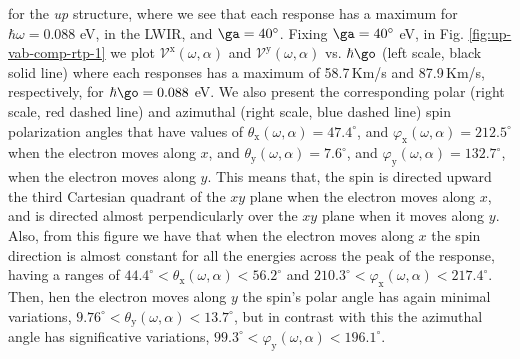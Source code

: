 \documentclass[prb,11pt,tightenlines,twocolumn,aps]{revtex4-1}
\begin{document}
for the
\emph{up} structure, where
%
we see that each response has a maximum for
$\hbar\omega=0.088$ eV,
in the LWIR, and 
$\ga=40^{\circ}$. 
% 
Fixing $\ga=40^{\circ}$ eV,
in Fig. \ref{fig:up-vab-comp-rtp-1} we plot 
$\mathcal{V}^{\mathrm{x}} (\omega,\alpha)$ 
and $\mathcal{V}^{\mathrm{y}}(\omega,\alpha)$ vs. $\hbar\go$
(left scale, black solid line) 
where each responses has a maximum of
58.7\,Km/s and 87.9\,Km/s, respectively, for $\hbar\go=0.088$ eV.
% 
We also
present the corresponding polar 
(right scale, red dashed line) 
and azimuthal 
(right scale, blue dashed line)
spin polarization angles
that have values of 
$\theta_{\mathrm{x}}(\omega,\alpha) = 47.4^{\circ}$,
and $\varphi_{\mathrm{x}}(\omega,\alpha) = 212.5^{\circ}$
 when the  electron moves along $x$,
and  $\theta_{\mathrm{y}}(\omega,\alpha) = 7.6^{\circ}$, and
 $\varphi_{\mathrm{y}} (\omega,\alpha) =132.7^{\circ}$,
when the electron moves along $y$.
This means that, the spin is directed upward the third Cartesian
quadrant of the $xy$ plane when the electron moves along $x$, and is directed almost
perpendicularly over the $xy$ plane when it moves along $y$.
% 
Also, from this figure we have that when the electron moves along $x$ the spin
direction is almost constant for all the energies across the peak of the
response, having a ranges of $ 44.4^{\circ} < \theta_{\mathrm{x}}
(\omega,\alpha) < 56.2^{\circ} $ and $210.3^{\circ} < \varphi_{\mathrm{x}}
(\omega,\alpha) < 217.4^{\circ}$. Then, hen the electron moves along $y$ the
spin's polar angle has again minimal variations, $ 9.76^{\circ} <
\theta_{\mathrm{y}} (\omega,\alpha) < 13.7^{\circ}$, but in contrast with this
the azimuthal angle has significative variations, $99.3^{\circ} <
\varphi_{\mathrm{y}} (\omega,\alpha) < 196.1^{\circ}$.

    
\end{document}
